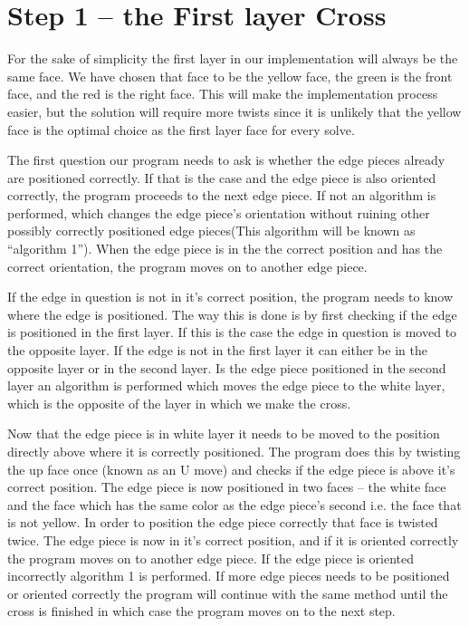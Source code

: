 \section{Step 1 -- the First layer Cross}
For the sake of simplicity the first layer in our implementation will always be the same face. We have chosen that face to be the yellow face, the green is the front face, and the red is the right face. This will make the implementation process easier, but the solution will require more twists since it is unlikely that the yellow face is the optimal choice as the first layer face for every solve.

The first question our program needs to ask is whether the edge pieces already are positioned correctly. If that is the case and the edge piece is also oriented correctly, the program proceeds to the next edge piece. If not an algorithm is performed, which changes the edge piece's orientation without ruining other possibly correctly positioned edge pieces(This algorithm will be known as "`algorithm 1"'). When the edge piece is in the the correct position and has the correct orientation, the program moves on to another edge piece. 

If the edge \piece{} in question is not in it's correct position, the program needs to know where the edge is positioned. 
The way this is done is by first checking if the edge \piece{} is positioned in the first layer. 
If this is the case the edge \piece{} in question is moved to the opposite layer. 
If the edge \piece{} is not in the first layer it can either be in the opposite layer or in the second layer.
Is the edge piece positioned in the second layer an algorithm is performed which moves the edge piece to the white layer, which is the opposite of the layer in which we make the cross.

Now that the edge piece is in white layer it needs to be moved to the position directly above where it is correctly positioned. 
The program does this by twisting the up face once (known as an U move) and checks if the edge piece is above it's correct position.
The edge piece is now positioned in two faces -- the white face and the face which has the same color as the edge piece's second \facelet{} i.e. the face that is not yellow.
In order to position the edge piece correctly that face is twisted twice.
The edge piece is now in it's correct position, and if it is oriented correctly the program moves on to another edge piece.
If the edge piece is oriented incorrectly algorithm 1 is performed. If more edge pieces needs to be positioned or oriented correctly the program will continue with the same method until the cross is finished in which case the program moves on to the next step.

